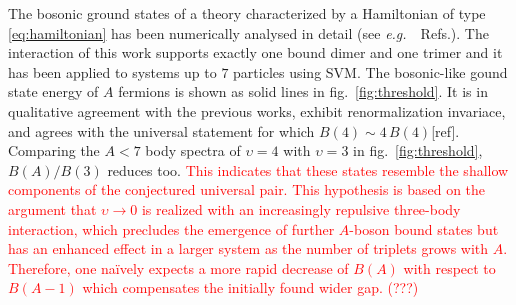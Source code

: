 \documentclass[preprint,12pt]{elsarticle}
\newcommand{\red}[1]{\textcolor{red}{#1}}
\newcommand{\eg}{\textit{e.g.}~}
\newcommand{\figref}[1]{fig.~\ref{#1}}
\begin{document}
The bosonic ground states of a theory characterized by a Hamiltonian of type \eqref{eq:hamiltonian} has been numerically analysed in detail (see \eg~Refs.\cite{Bazak:2016wxm,2015PhRvA..92c3626Y,Gattobigio:2012tk,vonStecher:2011zz,Gattobigio:2011ey}).
The interaction of this work supports exactly one bound dimer and one trimer and it has been applied to systems up to $7$ particles using SVM.
The bosonic-like gound state energy of $A$ fermions is shown as solid lines in \figref{fig:threshold}. 
It is in qualitative agreement with the previous works, exhibit renormalization invariace, and agrees with the universal statement for which $B(4)\sim4\,B(4)$[ref].
Comparing the $A<7$ body spectra of $\upsilon=4$ with $\upsilon=3$ in \figref{fig:threshold}, $B(A)/B(3)$ reduces too. 
\red{This indicates that these states resemble the shallow components of the conjectured universal pair. 
This hypothesis is based on the argument that $\upsilon\to0$ is realized with an increasingly repulsive three-body interaction, which precludes the emergence of further $A$-boson bound states but has an enhanced effect in a larger system as the number of triplets grows with $A$. 
Therefore, one na\"ively expects a more rapid decrease of $B(A)$ with respect to $B(A-1)$ which compensates the initially found wider gap. (???)}
\end{document}
